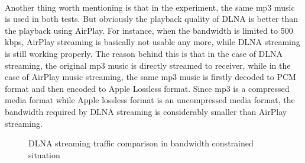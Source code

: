 \\
Another thing worth mentioning is that in the experiment, the same mp3 music is used in both tests. But obviously the playback quality of DLNA is better than the playback using AirPlay. For instance, when the bandwidth is limited to 500 kbps, AirPlay streaming is basically not usable any more, while DLNA streaming is still working properly. The reason behind this is that in the case of DLNA streaming, the original mp3 music is directly streamed to receiver, while in the case of AirPlay music streaming, the same mp3 music is firstly decoded to PCM format and then encoded to Apple Lossless format. Since mp3 is a compressed media format while Apple lossless format is an uncompressed media format, the bandwidth required by DLNA streaming is considerably smaller than AirPlay streaming.\\
\begin{figure}[hb]%
\caption{DLNA streaming traffic comparison in
bandwidth constrained situation\label{dlna_traffic_bw}}
\end{figure}
